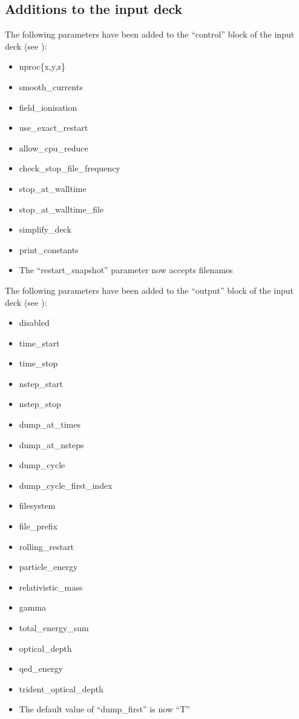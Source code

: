 \subsection{Additions to the input deck}
The following parameters have been added to the ``control'' block of
the input deck (see ):
\begin{itemize}
\item nproc\{x,y,z\}
\item smooth\_currents
\item field\_ionisation
\item use\_exact\_restart
\item allow\_cpu\_reduce
\item check\_stop\_file\_frequency
\item stop\_at\_walltime
\item stop\_at\_walltime\_file
\item simplify\_deck
\item print\_constants
\item The ``restart\_snapshot'' parameter now accepts filenames
\end{itemize}
\bigskip

\noindent The following parameters have been added to the ``output'' block of
the input deck (see ):
\begin{itemize}
\item disabled
\item time\_start
\item time\_stop
\item nstep\_start
\item nstep\_stop
\item dump\_at\_times
\item dump\_at\_nsteps
\item dump\_cycle
\item dump\_cycle\_first\_index
\item filesystem
\item file\_prefix
\item rolling\_restart
\item particle\_energy
\item relativistic\_mass
\item gamma
\item total\_energy\_sum
\item optical\_depth
\item qed\_energy
\item trident\_optical\_depth
\item The default value of ``dump\_first'' is now ``T''
\end{itemize}
\bigskip

